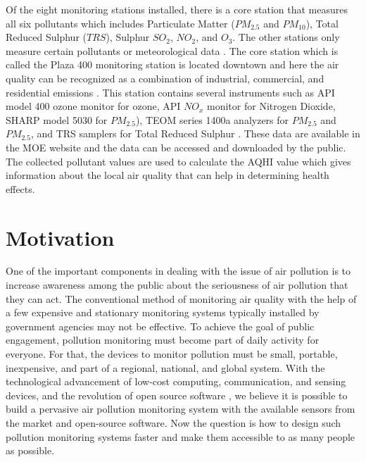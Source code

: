  Of the eight monitoring stations installed, there is a core station that measures all six pollutants which includes Particulate Matter ($PM_{2.5}$ and $PM_{10}$), Total Reduced Sulphur ($TRS$), Sulphur $SO_{2}$, $NO_2$, and ${O_3}$. The other stations only measure certain pollutants or meteorological data \cite{Environment2016}. The core station which is called the Plaza 400 monitoring station is located downtown and here the air quality can be recognized as a combination of industrial, commercial, and residential emissions \cite{Authority2011}. This station contains several instruments such as  API model 400 ozone monitor for ozone, API $NO_{x}$ monitor for Nitrogen Dioxide, SHARP model 5030 for $PM_{2.5}$), TEOM series 1400a analyzers for $PM_{2.5}$ and $PM_{2.5}$, and TRS samplers for Total Reduced Sulphur \cite{Environment2016}\cite{Authority2011}. These data are available in the MOE \cite{ MOE2020} website and the data can be accessed and downloaded by the public. The collected pollutant values are used to calculate the AQHI value which gives information about the local air quality that can help in determining health effects. %
 


\section{Motivation}

One of the important components in dealing with the issue of air pollution is to increase awareness among the public about the seriousness of air pollution that they can act. The conventional method of monitoring air quality with the help of a few expensive and stationary monitoring systems typically installed by government agencies may not be effective. To achieve the goal of public engagement, pollution monitoring must become part of daily activity for everyone. For that, the devices to monitor pollution must be small, portable, inexpensive, and part of a regional, national, and global system. With the technological advancement of low-cost computing, communication, and sensing devices, and the revolution of open source software \cite{Anthes2016}, we believe it is possible to build a pervasive air pollution monitoring system with the available sensors from the market and open-source software. Now the question is how to design such pollution monitoring systems faster and make them accessible to as many people as possible. 

